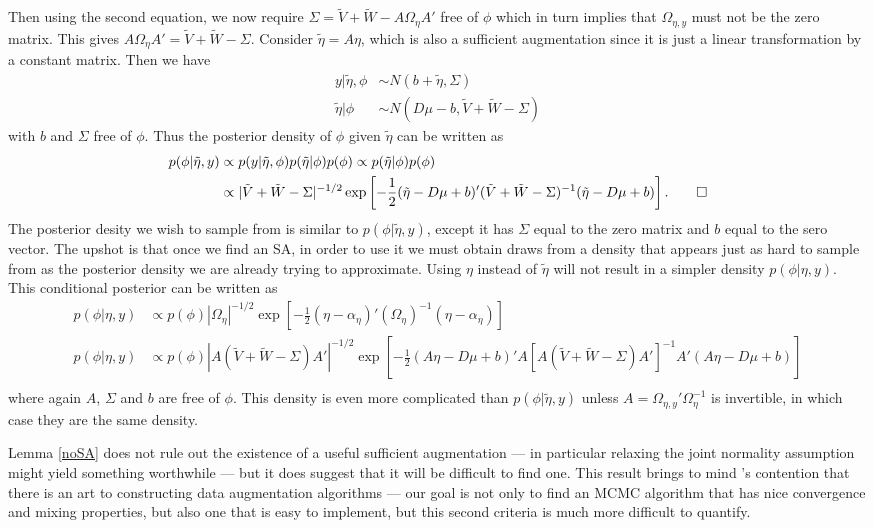 \documentclass{article}
\begin{document}
Then using the second equation, we now require $\Sigma = \tilde{V} + \tilde{W} - A\Omega_{\eta}A'$ free of $\phi$ which in turn implies that $\Omega_{\eta,y}$ must not be the zero matrix. This gives $A\Omega_{\eta}A' = \tilde{V} + \tilde{W} - \Sigma$. Consider $\tilde{\eta}=A\eta$, which is also a sufficient augmentation since it is just a linear transformation by a constant matrix. Then we have
\begin{align*}
y|\tilde{\eta},\phi & \sim N(b + \tilde{\eta}, \Sigma)\\
\tilde{\eta}|\phi & \sim N(D\mu - b, \tilde{V} + \tilde{W} - \Sigma)
\end{align*}
with $b$ and $\Sigma$ free of $\phi$. Thus the posterior density of $\phi$ given $\tilde{\eta}$ can be written as
\begin{align*}
  p(\phi|\tilde{\eta}, y) &\propto p(y|\tilde{\eta},\phi)p(\tilde{\eta}|\phi)p(\phi) \propto p(\tilde{\eta}|\phi)p(\phi) \\
&\propto |\tilde{V} + \tilde{W} - \Sigma|^{-1/2}\exp\left[-\frac{1}{2}(\tilde{\eta} - D\mu + b)'(\tilde{V} + \tilde{W} - \Sigma)^{-1}(\tilde{\eta} - D\mu + b)\right]. \qed
\end{align*}
The posterior desity we wish to sample from is similar to $p(\phi|\tilde{\eta},y)$, except it has $\Sigma$ equal to the zero matrix and $b$ equal to the sero vector. The upshot is that once we find an SA, in order to use it we must obtain draws from a density that appears just as hard to sample from as the posterior density we are already trying to approximate. Using $\eta$ instead of $\tilde{\eta}$ will not result in a simpler density $p(\phi|\eta,y)$. This conditional posterior can be written as
\begin{align*}
p(\phi|\eta,y) &\propto p(\phi) |\Omega_{\eta}|^{-1/2}\exp\left[-\frac{1}{2}(\eta - \alpha_{\eta})'(\Omega_{\eta})^{-1}(\eta - \alpha_{\eta})\right]\\
p(\phi|\eta,y) &\propto p(\phi) |A(\tilde{V} + \tilde{W} - \Sigma)A'|^{-1/2}\exp\left[-\frac{1}{2}(A\eta - D\mu + b)'A[A(\tilde{V} + \tilde{W} - \Sigma)A']^{-1}A'(A\eta - D\mu + b)\right]\\
\end{align*}
where again $A$, $\Sigma$ and $b$ are free of $\phi$. This density is even more complicated than $p(\phi|\tilde{\eta},y)$ unless $A=\Omega_{\eta,y}'\Omega_\eta^{-1}$ is invertible, in which case they are the same density.

Lemma \ref{noSA} does not rule out the existence of a useful sufficient augmentation --- in particular relaxing the joint normality assumption might yield something worthwhile --- but it does suggest that it will be difficult to find one. This result brings to mind 's contention that there is an art to constructing data augmentation algorithms --- our goal is not only to find an MCMC algorithm that has nice convergence and mixing properties, but also one that is easy to implement, but this second criteria is much more difficult to quantify. 
\end{document}
